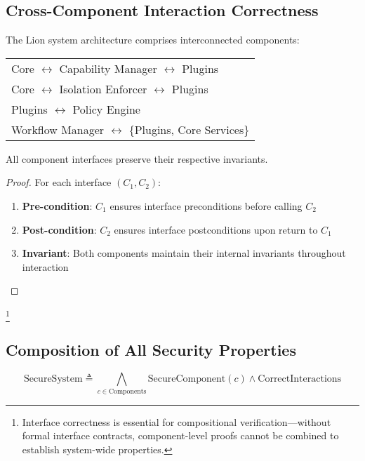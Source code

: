 \subsection{Cross-Component Interaction Correctness}

The Lion system architecture comprises interconnected components:

\begin{center}
\begin{tabular}{l}
Core $\leftrightarrow$ Capability Manager $\leftrightarrow$ Plugins \\
Core $\leftrightarrow$ Isolation Enforcer $\leftrightarrow$ Plugins \\
Plugins $\leftrightarrow$ Policy Engine \\
Workflow Manager $\leftrightarrow$ \{Plugins, Core Services\}
\end{tabular}
\end{center}

\begin{theorem}
\label{thm:interface-correctness}
All component interfaces preserve their respective invariants.
\end{theorem}

\begin{proof}
For each interface $(C_1, C_2)$:
\begin{enumerate}
\item \textbf{Pre-condition}: $C_1$ ensures interface preconditions before calling $C_2$
\item \textbf{Post-condition}: $C_2$ ensures interface postconditions upon return to $C_1$
\item \textbf{Invariant}: Both components maintain their internal invariants throughout interaction
\end{enumerate}
\end{proof}\footnote{Interface correctness is essential for compositional verification—without formal interface contracts, component-level proofs cannot be combined to establish system-wide properties.}

\subsection{Composition of All Security Properties}

\begin{definition}
$$\text{SecureSystem} \triangleq \bigwedge_{c \in \text{Components}} \text{SecureComponent}(c) \land \text{CorrectInteractions}$$
\end{definition}

